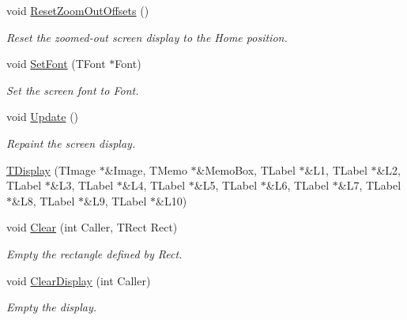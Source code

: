 \begin{DoxyCompactItemize}
void \mbox{\hyperlink{class_t_display_aae6570b04021b9a6e1748eb7f2bdf325}{Reset\+Zoom\+Out\+Offsets}} ()
\begin{DoxyCompactList}\small\item\em Reset the zoomed-\/out screen display to the \textquotesingle{}Home\textquotesingle{} position. \end{DoxyCompactList}\item 
\mbox{\label{class_t_display_af1ddcf928f3f5f3a39504f4e12bd51c0}} 
void \mbox{\hyperlink{class_t_display_af1ddcf928f3f5f3a39504f4e12bd51c0}{Set\+Font}} (T\+Font $\ast$Font)
\begin{DoxyCompactList}\small\item\em Set the screen font to \textquotesingle{}Font\textquotesingle{}. \end{DoxyCompactList}\item 
\mbox{\label{class_t_display_aa4f37ab2a4df6437a2219f303e1de40b}} 
void \mbox{\hyperlink{class_t_display_aa4f37ab2a4df6437a2219f303e1de40b}{Update}} ()
\begin{DoxyCompactList}\small\item\em Repaint the screen display. \end{DoxyCompactList}\item 
\mbox{\hyperlink{class_t_display_a72cbdba53131a636da2c656f6025574b}{T\+Display}} (T\+Image $\ast$\&Image, T\+Memo $\ast$\&Memo\+Box, T\+Label $\ast$\&L1, T\+Label $\ast$\&L2, T\+Label $\ast$\&L3, T\+Label $\ast$\&L4, T\+Label $\ast$\&L5, T\+Label $\ast$\&L6, T\+Label $\ast$\&L7, T\+Label $\ast$\&L8, T\+Label $\ast$\&L9, T\+Label $\ast$\&L10)
\item 
\mbox{\label{class_t_display_ab96c1fdec64997a8c252704ea6c231bf}} 
void \mbox{\hyperlink{class_t_display_ab96c1fdec64997a8c252704ea6c231bf}{Clear}} (int Caller, T\+Rect Rect)
\begin{DoxyCompactList}\small\item\em Empty the rectangle defined by Rect. \end{DoxyCompactList}\item 
\mbox{\label{class_t_display_a8d990507ae0111e0b7890e8aa77fd76d}} 
void \mbox{\hyperlink{class_t_display_a8d990507ae0111e0b7890e8aa77fd76d}{Clear\+Display}} (int Caller)
\begin{DoxyCompactList}\small\item\em Empty the display. \end{DoxyCompactList}\item 

\end{DoxyCompactItemize}
